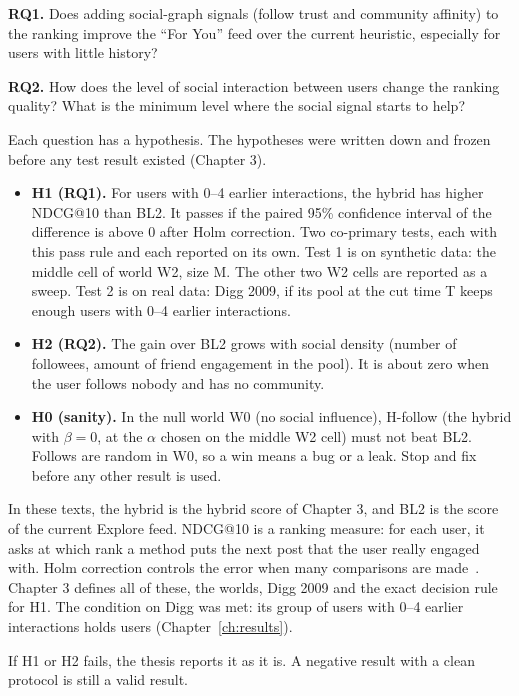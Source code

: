 \textbf{RQ1.} Does adding social-graph signals (follow trust and community affinity) to the ranking improve the ``For You'' feed over the current heuristic, especially for users with little history?

\textbf{RQ2.} How does the level of social interaction between users change the ranking quality? What is the minimum level where the social signal starts to help?

Each question has a hypothesis. The hypotheses were written down and frozen before any test result existed (Chapter 3).
\begin{itemize}
  \item \textbf{H1 (RQ1).} For users with 0--4 earlier interactions, the hybrid has higher NDCG@10 than BL2. It passes if the paired 95\% confidence interval of the difference is above 0 after Holm correction. Two co-primary tests, each with this pass rule and each reported on its own. Test 1 is on synthetic data: the middle cell of world W2, size M. The other two W2 cells are reported as a sweep. Test 2 is on real data: Digg 2009, if its pool at the cut time T keeps enough users with 0--4 earlier interactions.
  \item \textbf{H2 (RQ2).} The gain over BL2 grows with social density (number of followees, amount of friend engagement in the pool). It is about zero when the user follows nobody and has no community.
  \item \textbf{H0 (sanity).} In the null world W0 (no social influence), H-follow (the hybrid with $\beta = 0$, at the $\alpha$ chosen on the middle W2 cell) must not beat BL2. Follows are random in W0, so a win means a bug or a leak. Stop and fix before any other result is used.
\end{itemize}

In these texts, the hybrid is the hybrid score of Chapter 3, and BL2 is the score of the current Explore feed. NDCG@10 is a ranking measure: for each user, it asks at which rank a method puts the next post that the user really engaged with. Holm correction controls the error when many comparisons are made~. Chapter 3 defines all of these, the worlds, Digg 2009 and the exact decision rule for H1. The condition on Digg was met: its group of users with 0--4 earlier interactions holds \eTwoDiggNdcgTenZeroFourN{} users (Chapter~\ref{ch:results}).

If H1 or H2 fails, the thesis reports it as it is. A negative result with a clean protocol is still a valid result.

